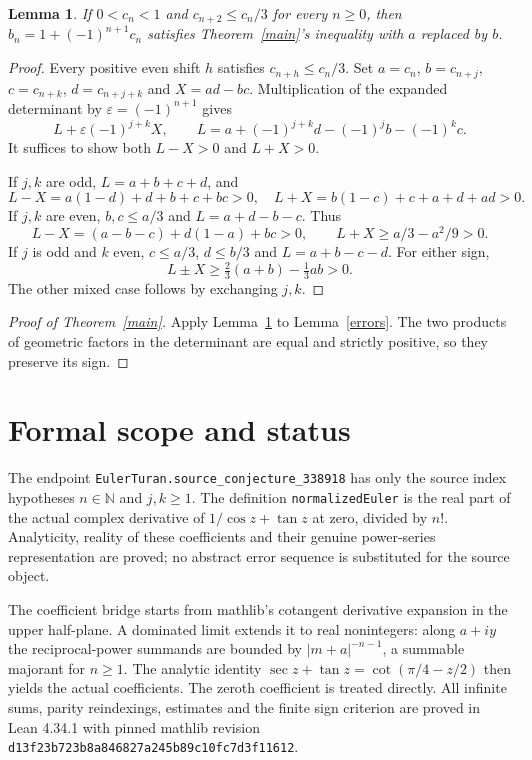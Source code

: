 \documentclass[11pt]{article}
\newtheorem{lemma}{Lemma}
\begin{document}
\begin{lemma}\label{criterion}
If $0<c_n<1$ and $c_{n+2}\leq c_n/3$ for every $n\geq0$, then
$b_n=1+(-1)^{n+1}c_n$ satisfies Theorem~\ref{main}'s inequality with $a$ replaced by $b$.
\end{lemma}
\begin{proof}
Every positive even shift $h$ satisfies $c_{n+h}\leq c_n/3$. Set
$a=c_n$, $b=c_{n+j}$, $c=c_{n+k}$, $d=c_{n+j+k}$ and $X=ad-bc$.
Multiplication of the expanded determinant by $\varepsilon=(-1)^{n+1}$ gives
\[
 L+\varepsilon(-1)^{j+k}X,\qquad
 L=a+(-1)^{j+k}d-(-1)^jb-(-1)^kc.
\]
It suffices to show both $L-X>0$ and $L+X>0$.

If $j,k$ are odd, $L=a+b+c+d$, and
\[
 L-X=a(1-d)+d+b+c+bc>0,\quad
 L+X=b(1-c)+c+a+d+ad>0.
\]
If $j,k$ are even, $b,c\leq a/3$ and $L=a+d-b-c$. Thus
\[
 L-X=(a-b-c)+d(1-a)+bc>0,\qquad
 L+X\geq a/3-a^2/9>0.
\]
If $j$ is odd and $k$ even, $c\leq a/3$, $d\leq b/3$ and $L=a+b-c-d$. For either sign,
\[
 L\pm X\geq\tfrac23(a+b)-\tfrac13ab>0.
\]
The other mixed case follows by exchanging $j,k$.
\end{proof}
\begin{proof}[Proof of Theorem~\ref{main}]
Apply Lemma~\ref{criterion} to Lemma~\ref{errors}. The two products of geometric factors in the determinant are equal and strictly positive, so they preserve its sign.
\end{proof}

\section*{Formal scope and status}
The endpoint \texttt{EulerTuran.source\_conjecture\_338918} has only the source index hypotheses $n\in\mathbb N$ and $j,k\geq1$. The definition \texttt{normalizedEuler} is the real part of the actual complex derivative of $1/\cos z+\tan z$ at zero, divided by $n!$. Analyticity, reality of these coefficients and their genuine power-series representation are proved; no abstract error sequence is substituted for the source object.

The coefficient bridge starts from mathlib's cotangent derivative expansion in the upper half-plane. A dominated limit extends it to real nonintegers: along $a+iy$ the reciprocal-power summands are bounded by $|m+a|^{-n-1}$, a summable majorant for $n\geq1$. The analytic identity $\sec z+\tan z=\cot(\pi/4-z/2)$ then yields the actual coefficients. The zeroth coefficient is treated directly. All infinite sums, parity reindexings, estimates and the finite sign criterion are proved in Lean 4.34.1 with pinned mathlib revision \texttt{d13f23b723b8a846827a245b89c10fc7d3f11612}.
\end{document}
